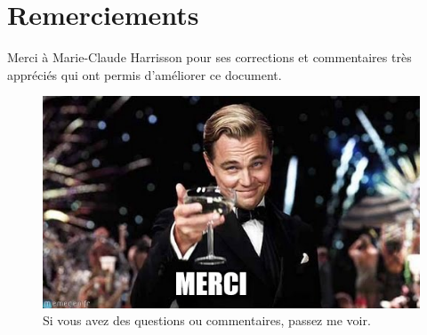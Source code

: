 \documentclass[../exemple_master.tex]{subfiles}
\begin{document}
\section{Remerciements}

Merci à Marie-Claude Harrisson pour ses corrections et commentaires très appréciés qui ont permis d'améliorer ce document.

\begin{figure}[!tbh]
    \centering
    \includegraphics[width=0.5\columnwidth]{img/merci}
    \caption{Si vous avez des questions ou commentaires, passez me voir.}
    \label{fig2_exemple}
\end{figure}
\end{document}

